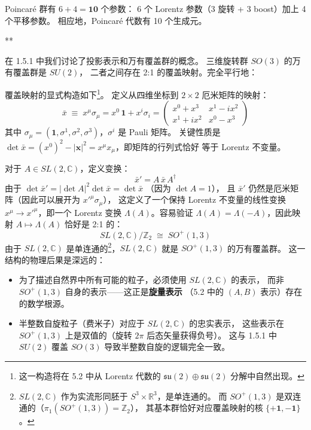 Poincar\'e 群有 $6 + 4 = \mathbf{10}$ 个参数：
6 个 Lorentz 参数（3 旋转 + 3 boost）加上 4 个平移参数。
相应地，Poincar\'e 代数有 10 个生成元。
\begin{center}
  \large ***
\end{center}
在 1.5.1 中我们讨论了投影表示和万有覆盖群的概念。
三维旋转群 $SO(3)$ 的万有覆盖群是 $SU(2)$，
二者之间存在 2:1 的覆盖映射。完全平行地：

\begin{center}
\end{center}

\noindent 覆盖映射的显式构造如下\footnote{
这一构造将在 5.2 中从 Lorentz 代数的
$\mathfrak{su}(2)\oplus\mathfrak{su}(2)$ 分解中自然出现。}。
定义从四维坐标到 $2\times 2$ 厄米矩阵的映射：
\begin{equation}\label{eq:x-to-matrix}
  \bar{x} \;\equiv\; x^\mu\sigma_\mu
  = x^0\,\mathbf{1} + x^i\sigma_i
  = \begin{pmatrix}
      x^0 + x^3 & x^1 - ix^2 \\
      x^1 + ix^2 & x^0 - x^3
    \end{pmatrix}
\end{equation}
其中 $\sigma_\mu = (\mathbf{1}, \sigma^1, \sigma^2, \sigma^3)$，$\sigma^i$ 是 Pauli 矩阵。
关键性质是 $\det\bar{x} = (x^0)^2 - |\mathbf{x}|^2 = x^\mu x_\mu$，即矩阵的行列式恰好
等于 Lorentz 不变量。

对于 $A \in SL(2,\mathbb{C})$，定义变换：
\begin{equation}\label{eq:SL2C-action}
  \bar{x}' = A\,\bar{x}\,A^\dagger
\end{equation}
由于 $\det\bar{x}' = |\det A|^2\det\bar{x} = \det\bar{x}$
（因为 $\det A = 1$），
且 $\bar{x}'$ 仍然是厄米矩阵（因此可以展开为 $x'^\mu\sigma_\mu$），
这定义了一个保持 Lorentz 不变量的线性变换 $x^\mu \to x'^\mu$，即一个 Lorentz 变换
$\Lambda(A)$。容易验证 $\Lambda(A) = \Lambda(-A)$，因此映射 $A \mapsto \Lambda(A)$ 恰好是 2:1 的：
\begin{equation}
  SL(2,\mathbb{C})\big/\mathbb{Z}_2 \;\cong\; SO^+(1,3)
\end{equation}
由于 $SL(2,\mathbb{C})$ 是单连通的\footnote{
$SL(2,\mathbb{C})$ 作为实流形同胚于 $S^3 \times \mathbb{R}^3$，是单连通的。
而 $SO^+(1,3)$ 是双连通的（$\pi_1(SO^+(1,3)) = \mathbb{Z}_2$），
其基本群恰好对应覆盖映射的核 $\{+\mathbf{1}, -\mathbf{1}\}$。
}，$SL(2,\mathbb{C})$ 就是 $SO^+(1,3)$ 的万有覆盖群。
这一结构的物理后果是深远的：
\begin{itemize}
  \item 为了描述自然界中所有可能的粒子，必须使用 $SL(2,\mathbb{C})$ 的表示，
        而非 $SO^+(1,3)$ 自身的表示——这正是\textbf{旋量表示}
        （5.2 中的 $(A,B)$ 表示）存在的数学根源。
  \item 半整数自旋粒子（费米子）对应于 $SL(2,\mathbb{C})$ 的忠实表示，
        这些表示在 $SO^+(1,3)$ 上是双值的（旋转 $2\pi$ 后态矢量获得负号）。
        这与 1.5.1 中 $SU(2)$ 覆盖 $SO(3)$ 导致半整数自旋的逻辑完全一致。
\end{itemize}